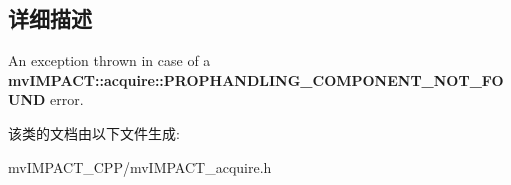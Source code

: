 \subsection{详细描述}
An exception thrown in case of a {\bfseries mv\+I\+M\+P\+A\+C\+T\+::acquire\+::\+P\+R\+O\+P\+H\+A\+N\+D\+L\+I\+N\+G\+\_\+\+C\+O\+M\+P\+O\+N\+E\+N\+T\+\_\+\+N\+O\+T\+\_\+\+F\+O\+U\+N\+D} error. 

该类的文档由以下文件生成\+:\begin{DoxyCompactItemize}
\item 
mv\+I\+M\+P\+A\+C\+T\+\_\+\+C\+P\+P/mv\+I\+M\+P\+A\+C\+T\+\_\+acquire.\+h\end{DoxyCompactItemize}
